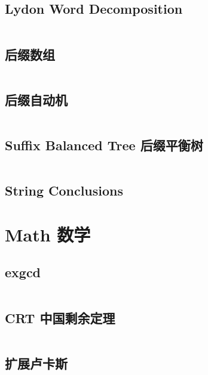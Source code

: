 \documentclass[titlepage, a4paper]{article}
\newcommand\nothing{}
\renewcommand{\checkmark}[0]{\nothing}
\begin{document}
\begin{multicols}{2}
\begin{spacing}{0.6}
				\subsection{Lydon Word Decomposition}
				\inputminted{cpp}{src/String/Lyndon Word.cpp}
				\subsection{后缀数组\checkmark}
				\inputminted{cpp}{src/String/SA.cpp}
				\subsection{后缀自动机}
				\inputminted{cpp}{src/String/SAM.cpp}
				\subsection{Suffix Balanced Tree 后缀平衡树}
				\inputminted{cpp}{src/String/后缀平衡树.cpp}
				\subsection{String Conclusions}
				
			
			\section{Math 数学}
				\subsection{exgcd}
				\inputminted{cpp}{src/Math/exgcd.cpp}
				\subsection{CRT 中国剩余定理}
				\inputminted{cpp}{src/Math/CRT_lbn.cpp}
				\subsection{扩展卢卡斯}
				\inputminted{cpp}{src/Math/扩展卢卡斯.cpp}

\end{spacing}
\end{multicols}
\end{document}

